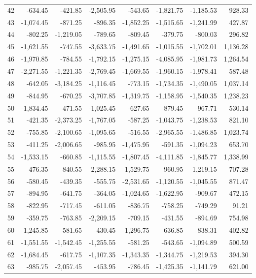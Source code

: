\begin{longtable}{rrrrrrrr}
42 & -634.45 & -421.85 & -2,505.95 & -543.65 & -1,821.75 & -1,185.53 & 928.33  \\
43 & -1,074.45 & -871.25 & -896.35 & -1,852.25 & -1,515.65 & -1,241.99 & 427.87  \\
44 & -802.25 & -1,219.05 & -789.65 & -809.45 & -379.75 & -800.03 & 296.82  \\
45 & -1,621.55 & -747.55 & -3,633.75 & -1,491.65 & -1,015.55 & -1,702.01 & 1,136.28  \\
46 & -1,970.85 & -784.55 & -1,792.15 & -1,275.15 & -4,085.95 & -1,981.73 & 1,264.54  \\
47 & -2,271.55 & -1,221.35 & -2,769.45 & -1,669.55 & -1,960.15 & -1,978.41 & 587.48  \\
48 & -642.05 & -3,184.25 & -1,116.45 & -773.15 & -1,734.35 & -1,490.05 & 1,037.14  \\
49 & -844.95 & -670.25 & -3,707.85 & -1,319.75 & -1,158.95 & -1,540.35 & 1,238.23  \\
50 & -1,834.45 & -471.55 & -1,025.45 & -627.65 & -879.45 & -967.71 & 530.14  \\
51 & -421.35 & -2,373.25 & -1,767.05 & -587.25 & -1,043.75 & -1,238.53 & 821.10  \\
52 & -755.85 & -2,100.65 & -1,095.65 & -516.55 & -2,965.55 & -1,486.85 & 1,023.74  \\
53 & -411.25 & -2,006.65 & -985.95 & -1,475.95 & -591.35 & -1,094.23 & 653.70  \\
54 & -1,533.15 & -660.85 & -1,115.55 & -1,807.45 & -4,111.85 & -1,845.77 & 1,338.99  \\
55 & -476.35 & -840.55 & -2,288.15 & -1,529.75 & -960.95 & -1,219.15 & 707.28  \\
56 & -580.45 & -439.35 & -555.75 & -2,531.65 & -1,120.55 & -1,045.55 & 871.47  \\
57 & -894.95 & -641.75 & -364.05 & -1,024.65 & -1,622.95 & -909.67 & 472.15  \\
58 & -822.95 & -717.45 & -611.05 & -836.75 & -758.25 & -749.29 & 91.21  \\
59 & -359.75 & -763.85 & -2,209.15 & -709.15 & -431.55 & -894.69 & 754.98  \\
60 & -1,245.85 & -581.65 & -430.45 & -1,296.75 & -636.85 & -838.31 & 402.82  \\
61 & -1,551.55 & -1,542.45 & -1,255.55 & -581.25 & -543.65 & -1,094.89 & 500.59  \\
62 & -1,684.45 & -617.75 & -1,107.35 & -1,343.35 & -1,344.75 & -1,219.53 & 394.30  \\
63 & -985.75 & -2,057.45 & -453.95 & -786.45 & -1,425.35 & -1,141.79 & 621.00  \\

\end{longtable}
